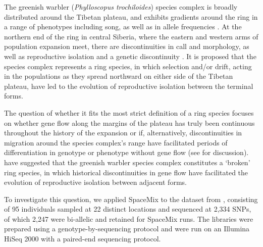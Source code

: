 \documentclass[12pt]{article}
\begin{document}
The greenish warbler (\textit{Phylloscopus trochiloides}) species complex is broadly distributed around the Tibetan plateau, and exhibits gradients around the ring in a range of phenotypes including song, as well as in allele frequencies \citep{ticehurst1938, Irwin2001, Irwin2005}.  At the northern end of the ring in central Siberia, where the eastern and western arms of population expansion meet, there are discontinuities in call and morphology, as well as reproductive isolation and a genetic discontinuity \citep{Irwin2001, Irwin2008}. It is proposed that the species complex represents a ring species, in which selection and/or drift, acting in the populations as they spread northward on either side of the Tibetan plateau, have led to the evolution of reproductive isolation between the terminal forms.

The question of whether it fits the most strict definition of a ring species focuses on whether gene flow along the margins of the plateau has truly been continuous throughout the history of the expansion or if, alternatively, discontinuities in migration around the species complex's range have facilitated periods of differentiation in genotype or phenotype without gene flow \citep{Mayr1942, Mayr1970, coyne_orr_speciation} (see \citep{wake_schneider1998} for discussion). 
\citet{alcaide2014genomic} have suggested that the greenish warbler species complex constitutes a `broken' ring species, in which historical discontinuities in gene flow have facilitated the evolution of reproductive isolation between adjacent forms.  

To investigate this question, we applied SpaceMix to the dataset from \citet{alcaide2014genomic}, 
consisting of 95 individuals sampled at 22 distinct locations and sequenced at 2,334 SNPs, of which 2,247 were bi-allelic and retained for SpaceMix runs.
The libraries were prepared using a genotype-by-sequencing protocol and were run on an Illumina HiSeq 2000 with a paired-end sequencing protocol.
\end{document}
